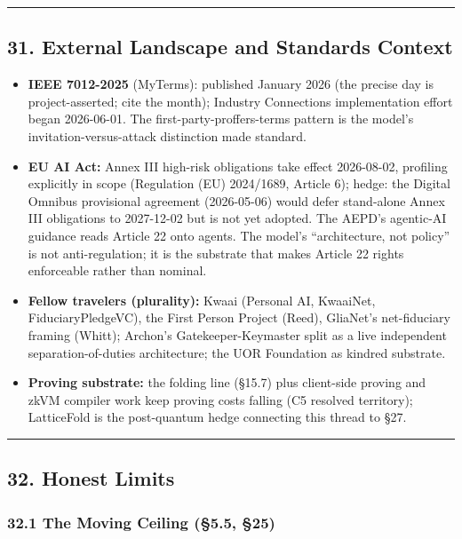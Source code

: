 \documentclass[
]{article}
\providecommand{\tightlist}{%
  \setlength{\itemsep}{0pt}\setlength{\parskip}{0pt}}
\begin{document}
\begin{center}\rule{0.5\linewidth}{0.5pt}\end{center}

\subsection{31. External Landscape and Standards
Context}\label{external-landscape-and-standards-context}

\begin{itemize}
\tightlist
\item
  \textbf{IEEE 7012-2025} (MyTerms): published January 2026 (the precise
  day is project-asserted; cite the month); Industry Connections
  implementation effort began 2026-06-01. The first-party-proffers-terms
  pattern is the model's invitation-versus-attack distinction made
  standard.
\item
  \textbf{EU AI Act:} Annex III high-risk obligations take effect
  2026-08-02, profiling explicitly in scope (Regulation (EU) 2024/1689,
  Article 6); hedge: the Digital Omnibus provisional agreement
  (2026-05-06) would defer stand-alone Annex III obligations to
  2027-12-02 but is not yet adopted. The AEPD's agentic-AI guidance
  reads Article 22 onto agents. The model's ``architecture, not policy''
  is not anti-regulation; it is the substrate that makes Article 22
  rights enforceable rather than nominal.
\item
  \textbf{Fellow travelers (plurality):} Kwaai (Personal AI, KwaaiNet,
  FiduciaryPledgeVC), the First Person Project (Reed), GliaNet's
  net-fiduciary framing (Whitt); Archon's Gatekeeper-Keymaster split as
  a live independent separation-of-duties architecture; the UOR
  Foundation as kindred substrate.
\item
  \textbf{Proving substrate:} the folding line (§15.7) plus client-side
  proving and zkVM compiler work keep proving costs falling (C5 resolved
  territory); LatticeFold is the post-quantum hedge connecting this
  thread to §27.
\end{itemize}

\begin{center}\rule{0.5\linewidth}{0.5pt}\end{center}

\subsection{32. Honest Limits}\label{honest-limits}

\subsubsection{32.1 The Moving Ceiling (§5.5,
§25)}\label{the-moving-ceiling-5.5-25}
\end{document}
